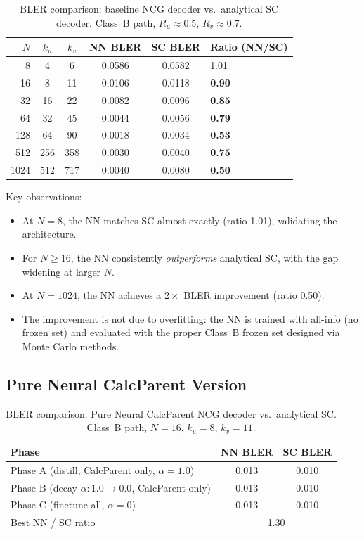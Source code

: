 \documentclass[11pt,a4paper]{article}
\begin{document}
\begin{table}[H]
\centering
\caption{BLER comparison: baseline NCG decoder vs.\ analytical SC decoder. Class~B path, $R_u \approx 0.5$, $R_v \approx 0.7$.}
\label{tab:bler_sbb}
\begin{tabular}{rccccl}
\toprule
$N$ & $k_u$ & $k_v$ & NN BLER & SC BLER & Ratio (NN/SC) \\
\midrule
8    & 4   & 6   & 0.0586  & 0.0582  & 1.01 \\
16   & 8   & 11  & 0.0106  & 0.0118  & \textbf{0.90} \\
32   & 16  & 22  & 0.0082  & 0.0096  & \textbf{0.85} \\
64   & 32  & 45  & 0.0044  & 0.0056  & \textbf{0.79} \\
128  & 64  & 90  & 0.0018  & 0.0034  & \textbf{0.53} \\
512  & 256 & 358 & 0.0030  & 0.0040  & \textbf{0.75} \\
1024 & 512 & 717 & 0.0040  & 0.0080  & \textbf{0.50} \\
\bottomrule
\end{tabular}
\end{table}

Key observations:
\begin{itemize}
    \item At $N = 8$, the NN matches SC almost exactly (ratio 1.01), validating the architecture.
    \item For $N \geq 16$, the NN consistently \emph{outperforms} analytical SC, with the gap widening at larger $N$.
    \item At $N = 1024$, the NN achieves a $2\times$ BLER improvement (ratio 0.50).
    \item The improvement is not due to overfitting: the NN is trained with all-info (no frozen set) and evaluated with the proper Class~B frozen set designed via Monte Carlo methods.
\end{itemize}

\subsection{Pure Neural CalcParent Version}

\begin{table}[H]
\centering
\caption{BLER comparison: Pure Neural CalcParent NCG decoder vs.\ analytical SC. Class~B path, $N = 16$, $k_u = 8$, $k_v = 11$.}
\label{tab:bler_pure}
\begin{tabular}{lcc}
\toprule
Phase & NN BLER & SC BLER \\
\midrule
Phase A (distill, CalcParent only, $\alpha = 1.0$) & 0.013 & 0.010 \\
Phase B (decay $\alpha: 1.0 \to 0.0$, CalcParent only) & 0.013 & 0.010 \\
Phase C (finetune all, $\alpha = 0$) & 0.013 & 0.010 \\
\midrule
Best NN / SC ratio & \multicolumn{2}{c}{1.30} \\
\bottomrule
\end{tabular}
\end{table}
\end{document}
